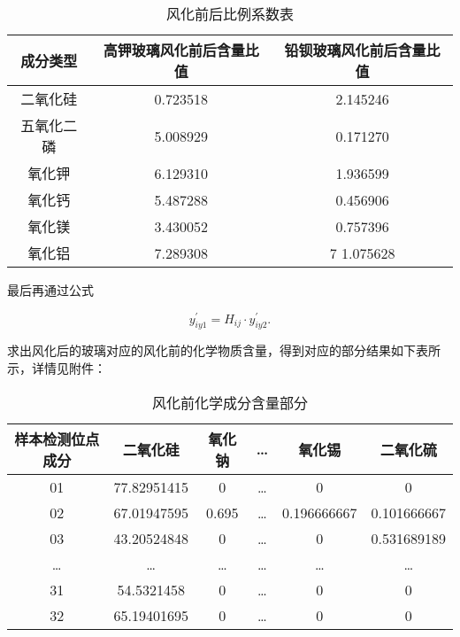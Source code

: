 \begin{table}[H]
	\centering
	\begin{tabular}{c c c} 
		\toprule[1.5pt]
		成分类型 & 高钾玻璃风化前后含量比值 & 铅钡玻璃风化前后含量比值 \\
		\midrule[1pt]
		二氧化硅 & 0.723518 & 2.145246 \\
		五氧化二磷 & 5.008929 & 0.171270 \\
		氧化钾 & 6.129310 & 1.936599 \\
		氧化钙 & 5.487288 & 0.456906 \\
		氧化镁	& 3.430052 & 0.757396 \\
		氧化铝	& 7.289308 & 7 1.075628 \\
		\toprule[1.5pt]
	\end{tabular}
\caption{风化前后比例系数表}
\end{table}



最后再通过公式

\begin{equation}
    y_{iy1}^{'}={{H}_{ij}}\cdot y_{iy2}^{'}.
\end{equation}

求出风化后的玻璃对应的风化前的化学物质含量，得到对应的部分结果如下表所示，详情见附件：

\begin{table}[H]
	\centering
    \begin{tabular}{c c c c c c} 
        \toprule[1.5pt]
        样本检测位点成分 &	二氧化硅 &	氧化钠 & 	\dots &	氧化锡 &	二氧化硫 \\
        \midrule[1pt]
        01 &	77.82951415 &	0 &	\dots &	0 &	0 \\
        02 &	67.01947595 &	0.695 &	\dots &	0.196666667 &	0.101666667 \\
        03 &	43.20524848 &	0 &	\dots &	0 &	0.531689189 \\
        \dots &	\dots &	\dots &	\dots &	\dots &	\dots \\
        31 &	54.5321458 &	0 &	\dots &	0 &	0 \\
        32 &	65.19401695 &	0 &	\dots &	0 &	0 \\
        \toprule[1.5pt]
    \end{tabular}
    \caption{风化前化学成分含量部分}
\end{table} 